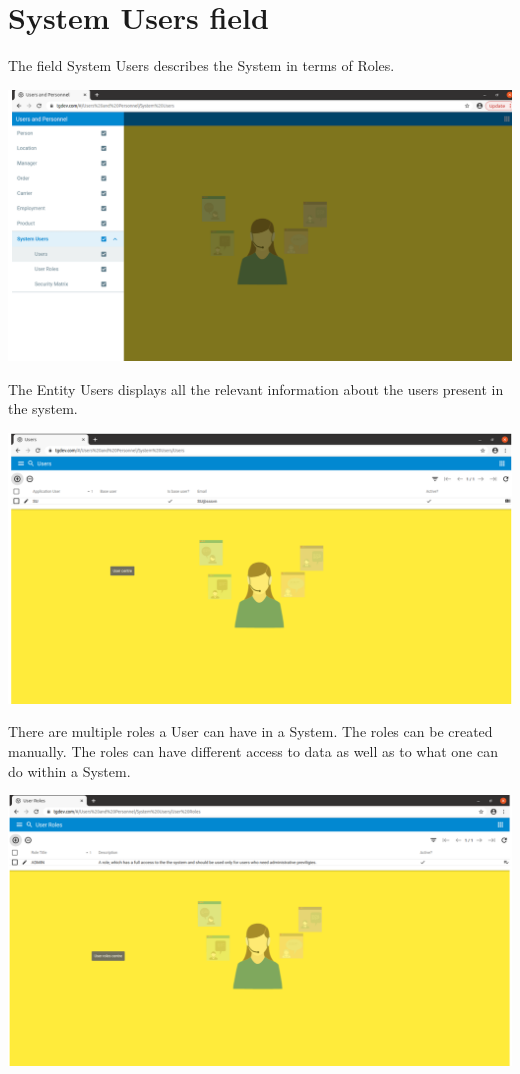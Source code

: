 \section{System Users field}

The field System Users describes the System in terms of Roles. 

\includegraphics[width=\textwidth]{sections/01-chapter/images/system1.png}

The Entity Users displays all the relevant information about the users present in the system.

\includegraphics[width=\textwidth]{sections/01-chapter/images/system2.png}

There are multiple roles a User can have in a System. The roles can be created manually. The roles can have different access to data as well as to what one can do within a System.

\includegraphics[width=\textwidth]{sections/01-chapter/images/system3.png}

